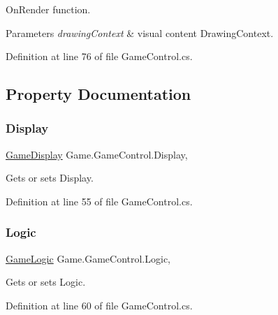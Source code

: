 On\+Render function. 


\begin{DoxyParams}{Parameters}
{\em drawing\+Context} & visual content Drawing\+Context.\\
\hline
\end{DoxyParams}


Definition at line 76 of file Game\+Control.\+cs.



\subsection{Property Documentation}
\mbox{\label{class_game_1_1_game_control_aee5d0e7fcb3ab64a72b5e041b9603293}} 
\subsubsection{\texorpdfstring{Display}{Display}}
{\footnotesize\ttfamily \mbox{\hyperlink{class_game_1_1_game_display}{Game\+Display}} Game.\+Game\+Control.\+Display\hspace{0.3cm}{\ttfamily [get]}, {\ttfamily [set]}}



Gets or sets Display. 



Definition at line 55 of file Game\+Control.\+cs.

\mbox{\label{class_game_1_1_game_control_a86b2e15b7f099f35f858739f09392ac2}} 
\subsubsection{\texorpdfstring{Logic}{Logic}}
{\footnotesize\ttfamily \mbox{\hyperlink{class_game_1_1_game_logic}{Game\+Logic}} Game.\+Game\+Control.\+Logic\hspace{0.3cm}{\ttfamily [get]}, {\ttfamily [set]}}



Gets or sets Logic. 



Definition at line 60 of file Game\+Control.\+cs.

